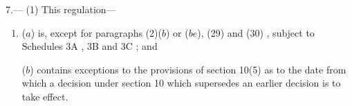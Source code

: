 \documentclass[12pt,a4paper]{article}
\begin{document}
7.—%
%
(1) This regulation---
\begin{enumerate}\item[]


($a$) is, except for 
paragraphs (2)($b$)
or ($be$), (29) and (30)%
, subject to Schedules 3A%
, 3B and 3C%
; and

($b$) contains exceptions to the provisions of section 10(5) as to the date from which a decision under section 10 which supersedes an earlier decision is to take effect.
\end{enumerate}
\end{document}
